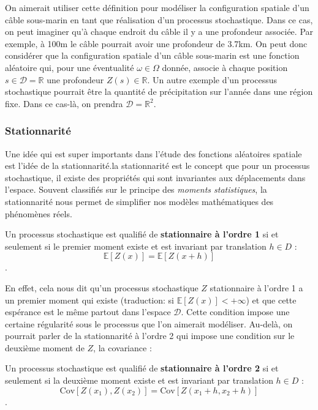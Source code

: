 \documentclass[10pt]{article} %
\begin{document}
On aimerait utiliser cette définition pour modéliser la configuration spatiale d'un câble sous-marin en tant que réalisation d'un processus stochastique.
Dans ce cas, on peut imaginer qu'à chaque endroit du câble il y a une profondeur associée. Par exemple, à 100m le câble pourrait avoir une profondeur de 3.7km. On peut donc
considérer que la configuration spatiale d'un câble sous-marin est une fonction aléatoire qui, pour une éventualité $\omega \in \Omega$ donnée, associe à chaque position
$s \in \mathcal{D} = \mathbb{R}$ une profondeur $Z(s) \in \mathbb{R}$. Un autre exemple d'un processus stochastique pourrait être la quantité de précipitation sur l'année dans une région fixe. Dans ce cas-là, on prendra $\mathcal{D} = \mathbb{R}^2$.

\subsubsection{Stationnarité}

Une idée qui est super importants dans l'étude des fonctions aléatoires spatiale est l'idée de la stationnarité.la stationnarité est le concept que pour un processus stochastique,
il existe des propriétés qui sont invariantes aux déplacements dans l'espace. Souvent classifiés sur le principe des \textit{moments statistiques}, la stationnarité nous permet de simplifier nos modèles mathématiques des
phénomènes réels.

\begin{definition}
    Un processus stochastique est qualifié de \textbf{stationnaire à l'ordre 1} si et seulement si le premier moment existe et est invariant par translation $h \in D$ :
    $$ \mathbb{E}[Z(x)] = \mathbb{E}[Z(x + h)]$$.
\end{definition}

En effet, cela nous dit qu'un processus stochastique $Z$ stationnaire à l'ordre 1 a un premier moment qui existe (traduction: si $\mathbb{E}[Z(x)] < +\infty$) et que cette espérance
est le même partout dans l'espace $\mathcal{D}$. Cette condition impose une certaine régularité sous le processus que l'on aimerait modéliser. Au-delà, on pourrait parler de la stationnarité
à l'ordre 2 qui impose une condition sur le deuxième moment de $Z$, la covariance :

\begin{definition}
    Un processus stochastique est qualifié de \textbf{stationnaire à l'ordre 2} si et seulement si la deuxième moment existe et est invariant par translation $h \in D$ :
    $$ \mathrm{Cov}[Z(x_1), Z(x_2)] = \mathrm{Cov}[Z(x_1 + h, x_2 + h)]$$.
\end{definition}
\end{document}

